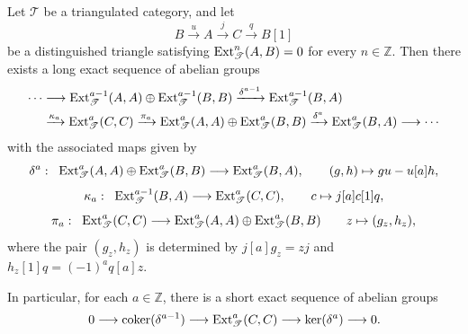 \documentclass[11pt]{article}
\begin{document}
\begin{Lem}
\label{frame:orthogonal-triangle}
Let $\mathscr T$ be a triangulated category, and let
\[
 B\xrightarrow{u}A\xrightarrow{j}C\xrightarrow{q}B[1]
\]
be a distinguished triangle satisfying
${\rm Ext}_{\mathscr T}^n(A,B)=0$ for every $n\in\mathbb Z$.
Then there exists a long exact sequence of abelian groups
\[
\begin{aligned}
\cdots&\longrightarrow
 {\rm Ext}_{\mathscr T}^{a-1}(A,A)\oplus
 {\rm Ext}_{\mathscr T}^{a-1}(B,B)
 \xrightarrow{\delta^{a-1}}{\rm Ext}_{\mathscr T}^{a-1}(B,A)\\
&\xrightarrow{\kappa_a}{\rm Ext}_{\mathscr T}^a(C,C)
 \xrightarrow{\pi_a}
 {\rm Ext}_{\mathscr T}^a(A,A)\oplus{\rm Ext}_{\mathscr T}^a(B,B)
 \xrightarrow{\delta^a}{\rm Ext}_{\mathscr T}^a(B,A)
 \longrightarrow\cdots
\end{aligned}
\]
with the associated maps given by
\[
 \delta^a:\;\;{\rm Ext}_{\mathscr T}^a(A,A)\oplus
                   {\rm Ext}_{\mathscr T}^a(B,B)
       \longrightarrow{\rm Ext}_{\mathscr T}^a(B,A),
 \qquad (g,h)\mapsto gu-u[a]h,
\]
\[
\kappa_a:\;\; {\rm Ext}_{\mathscr T}^{a-1}(B,A)
       \longrightarrow{\rm Ext}_{\mathscr T}^a(C,C),
 \qquad c\mapsto j[a]c[1]q,
\]
\[
\pi_a:\;\; {\rm Ext}_{\mathscr T}^a(C,C)\longrightarrow
{\rm Ext}_{\mathscr T}^a(A,A)\oplus{\rm Ext}_{\mathscr T}^a(B,B)\qquad
z\mapsto (g_z,h_z),
\]
where the pair $(g_z,h_z)$ is determined by $j[a]g_z=zj$ and $h_z[1]q=(-1)^a q[a]z$.

In particular, for each $a\in\mathbb{Z}$, there is a short exact sequence of abelian groups
\begin{equation*}
 0\longrightarrow\operatorname{coker}(\delta^{a-1})
 \longrightarrow{\rm Ext}_{\mathscr T}^a(C,C)
 \longrightarrow\ker(\delta^a)\longrightarrow0.
\end{equation*}
\end{Lem}
\end{document}
